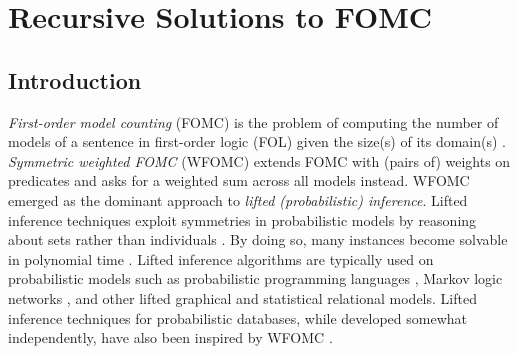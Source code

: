 



\chapter{Recursive Solutions to FOMC}\label{chapter:wfomc}

\section{Introduction}


\emph{First-order model counting} (FOMC) is the problem of computing the number
of models of a sentence in first-order logic (FOL) given the size(s) of its
domain(s) \citep{DBLP:conf/pods/BeameBGS15}. \emph{Symmetric weighted FOMC}
(WFOMC) extends FOMC with (pairs of) weights on predicates and asks for a
weighted sum across all models instead. WFOMC emerged as the dominant approach
to \emph{lifted (probabilistic) inference}. Lifted inference techniques exploit
symmetries in probabilistic models by reasoning about sets rather than
individuals \citep{DBLP:conf/ecai/Kersting12}. By doing so, many instances
become solvable in polynomial time \citep{DBLP:conf/nips/Broeck11}. Lifted
inference algorithms are typically used on probabilistic models such as
probabilistic programming languages
\citep{DBLP:journals/ml/RaedtK15,DBLP:journals/ijar/RiguzziBZCL17}, Markov logic
networks
\citep{DBLP:conf/ijcai/BroeckTMDR11,DBLP:journals/cacm/GogateD16,DBLP:journals/ml/RichardsonD06},
and other lifted graphical \citep{DBLP:journals/ml/KimmigMG15} and statistical
relational \citep{DBLP:series/synthesis/2016Raedt} models. Lifted inference
techniques for probabilistic databases, while developed somewhat independently,
have also been inspired by WFOMC
\citep{DBLP:journals/pvldb/GatterbauerS15,DBLP:journals/debu/GribkoffSB14}.

